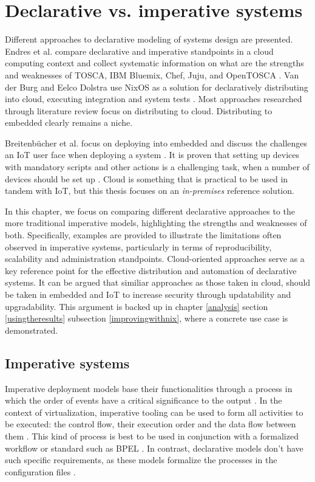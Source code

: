 \chapter{Declarative vs. imperative systems} \label{imperative}

Different approaches to declarative modeling of
systems design are presented. Endres et al. compare declarative and imperative
standpoints in a cloud computing context and collect systematic
information on what are the strengths and weaknesses of TOSCA, IBM
Bluemix, Chef, Juju, and OpenTOSCA \cite{endres2017declarative}. Van
der Burg and Eelco Dolstra use NixOS as a solution for declaratively
distributing into cloud, executing integration and system tests
\cite{van2010declarative}. Most approaches researched through
literature review focus on distributing to cloud. Distributing to
embedded clearly remains a niche.

Breitenbücher et al. focus on deploying into embedded and discuss
the challenges an IoT user face when deploying a system \cite{breitenbucher2017declarative}. It is proven
that setting up devices with mandatory scripts and other actions is a
challenging task, when a number of devices should be set up \cite{breitenbucher2017declarative}. Cloud is
something that is practical to be used in tandem with IoT, but this thesis
focuses on an \textit{in-premises} reference
solution. 

In this chapter, we focus on comparing different declarative
approaches to the more traditional imperative models, highlighting the
strengths and weaknesses of both. Specifically, examples are provided
to illustrate the limitations often observed in imperative systems,
particularly in terms of reproducibility, scalability and
administration standpoints. Cloud-oriented approaches serve as a key
reference point for the effective distribution and automation of
declarative systems. It can be argued that similiar approaches as
those taken in cloud, should be taken in embedded and IoT to increase
security through updatability and upgradability. This argument is backed up
in chapter \ref{analysis} section \ref{usingtheresults}
subsection \ref{improvingwithnix}, where a concrete use case is demonstrated.

\section{Imperative systems}

Imperative deployment models base their functionalities through a
process in which the order of events have a critical significance to
the output \cite{breitenbucher2017declarative}. In the context of
virtualization, imperative tooling can be used to form all
activities to be executed: the control flow, their execution order
and the data flow between them \cite{endres2017declarative}. This kind
of process is best to be used in conjunction with a formalized
workflow or standard such as BPEL \cite{endres2017declarative}. In
contrast, declarative models don't have such specific requirements, as
these models formalize the processes in the configuration files
\cite{endres2017declarative}.

